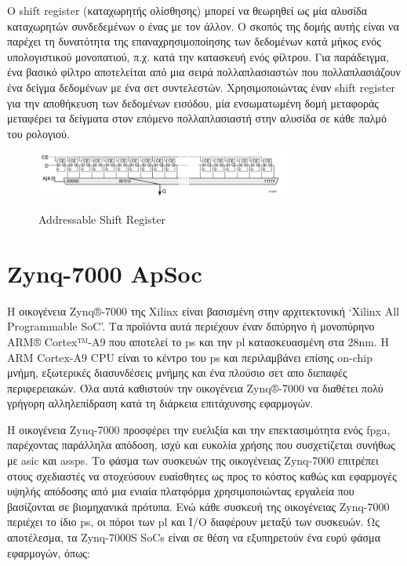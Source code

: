 Ο shift register (καταχωρητής ολίσθησης) μπορεί να θεωρηθεί ως μία αλυσίδα καταχωρητών συνδεδεμένων ο ένας με τον άλλον. Ο σκοπός της δομής αυτής είναι να παρέχει τη δυνατότητα της επαναχρησιμοποίησης των δεδομένων κατά μήκος ενός υπολογιστικού μονοπατιού, π.χ. κατά την κατασκευή ενός φίλτρου. Για παράδειγμα, ένα βασικό φίλτρο αποτελείται από μια σειρά πολλαπλασιαστών που πολλαπλασιάζουν ένα δείγμα δεδομένων με ένα σετ συντελεστών. Χρησιμοποιώντας έναν shift register για την αποθήκευση των δεδομένων εισόδου, μία ενσωματωμένη δομή μεταφοράς μεταφέρει τα δείγματα στον επόμενο πολλαπλασιαστή στην αλυσίδα σε κάθε παλμό του ρολογιού.
\begin{figure}[H]
  	\centering
	\includegraphics[width=0.75\textwidth]{images/shftreg}\\
	\caption{Addressable Shift Register \cite{bram}}
\end{figure}
\section{Zynq-7000 ApSoc}

Η οικογένεια Zynq®-7000 της Xilinx είναι βασισμένη στην αρχιτεκτονική `Xilinx All Programmable SoC'. Τα προϊόντα αυτά περιέχουν έναν διπύρηνο ή μονοπύρηνο ARM® Cortex™-A9 που αποτελεί το \gls{ps} και την \gls{pl} κατασκευασμένη στα 28nm. H ARM Cortex-A9 CPU είναι το κέντρο του \gls{ps} και περιλαμβάνει επίσης on-chip μνήμη, εξωτερικές διασυνδέσεις μνήμης και ένα πλούσιο σετ απο διεπαφές περιφερειακών. Όλα αυτά καθιστούν την οικογένεια Zynq®-7000 να διαθέτει πολύ γρήγορη αλληλεπίδραση κατά τη διάρκεια επιτάχυνσης εφαρμογών. \cite{ds190}

Η οικογένεια Zynq-7000 προσφέρει την ευελιξία και την επεκτασιμότητα ενός \gls{fpga}, παρέχοντας παράλληλα απόδοση, ισχύ και ευκολία χρήσης που συσχετίζεται συνήθως με \gls{asic} και \gls{assp}s. Το φάσμα των συσκευών της οικογένειας Zynq-7000 επιτρέπει στους σχεδιαστές να στοχεύσουν ευαίσθητες ως προς το κόστος καθώς και εφαρμογές υψηλής απόδοσης από μια ενιαία πλατφόρμα χρησιμοποιώντας εργαλεία που βασίζονται σε βιομηχανικά πρότυπα. Ενώ κάθε συσκευή της οικογένειας Zynq-7000 περιέχει το ίδιο \gls{ps}, οι πόροι των \gls{pl} και I/O  διαφέρουν μεταξύ των συσκευών. Ως αποτέλεσμα, τα Zynq-7000S SoCs είναι σε θέση να εξυπηρετούν ένα ευρύ φάσμα εφαρμογών, όπως: \\

